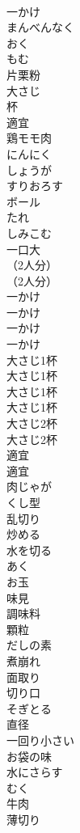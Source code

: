 \documentclass[8pt]{extreport}
\begin{document}
\begin{CJK}{UTF8}{min}
\\	一かけ
\\	まんべんなく
\\	おく
\\	もむ
\\	片栗粉
\\	大さじ
\\	杯
\\	適宜
\\	鶏モモ肉
\\	にんにく
\\	しょうが
\\	すりおろす
\\	ボール
\\	たれ
\\	しみこむ
\\	一口大
\\	（2人分）	
\\	（2人分） 
\\	一かけ	
\\	一かけ 
\\	一かけ	
\\	一かけ 
\\	大さじ1杯	
\\	大さじ1杯 
\\	大さじ1杯	
\\	大さじ1杯 
\\	大さじ2杯	
\\	大さじ2杯 
\\	適宜	
\\	適宜 
\\	肉じゃが
\\	くし型
\\	乱切り
\\	炒める
\\	水を切る
\\	あく
\\	お玉
\\	味見
\\	調味料
\\	顆粒
\\	だしの素
\\	煮崩れ
\\	面取り
\\	切り口
\\	そぎとる
\\	直径
\\	一回り小さい
\\	お袋の味
\\	水にさらす
\\	むく
\\	牛肉
\\	薄切り

\end{CJK}
\end{document}

